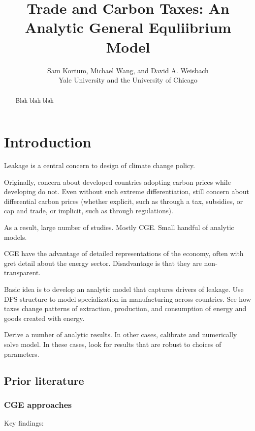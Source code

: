 \documentclass[notitlepage,12pt]{article}
\begin{document}
\title{Trade and Carbon Taxes: An Analytic General Equliibrium Model}
\author{Sam Kortum, Michael Wang, and David A. Weisbach \\
Yale University and the University of Chicago}
\maketitle

\begin{abstract}
Blah blah blah
\end{abstract}

\section{Introduction}

Leakage is a central concern to design of climate change policy.

Originally, concern about developed countries adopting carbon prices while
developing do not. Even without such extreme differentiation, still concern
about differential carbon prices (whether explicit, such as through a tax,
subsidies, or cap and trade, or implicit, such as through regulations).

As a result, large number of studies. Mostly CGE. Small handful of analytic
models.

CGE have the advantage of detailed representations of the economy, often
with gret detail about the energy sector. Disadvantage is that they are
non-transparent.

Basic idea is to develop an analytic model that captures drivers of leakage.
Use DFS structure to model specialization in manufacturing across countries.
See how taxes change patterns of extraction, production, and consumption of
energy and goods created with energy.

Derive a number of analytic results. In other cases, calibrate and
numerically solve model. In these cases, look for results that are robust to
choices of parameters.

\subsection{Prior literature}

\subsubsection{CGE approaches}

Key findings:
\end{document}
